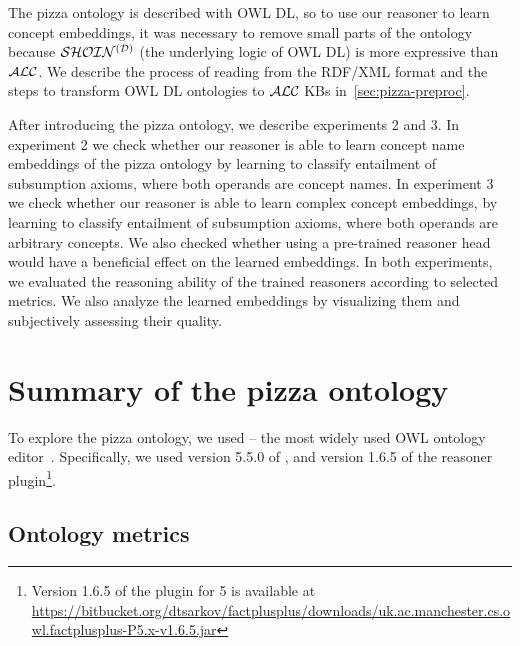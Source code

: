 The pizza ontology is described with OWL DL, so to use our reasoner to learn concept embeddings, it was necessary to remove small parts of the ontology because $\mathcal{SHOIN^{(D)}}$ (the underlying logic of OWL DL) is more expressive than $\mathcal{ALC}$.
We describe the process of reading from the RDF/XML format and the steps to transform OWL DL ontologies to $\mathcal{ALC}$ KBs in~\autoref{sec:pizza-preproc}.

After introducing the pizza ontology, we describe experiments 2 and 3.
In experiment 2 we check whether our reasoner is able to learn concept name embeddings of the pizza ontology by learning to classify entailment of subsumption axioms, where both operands are concept names.
In experiment 3 we check whether our reasoner is able to learn complex concept embeddings, by learning to classify entailment of subsumption axioms, where both operands are arbitrary concepts.
We also checked whether using a pre-trained reasoner head would have a beneficial effect on the learned embeddings.
In both experiments, we evaluated the reasoning ability of the trained reasoners according to selected metrics. We also analyze the learned embeddings by visualizing them and subjectively assessing their quality.

\newpage

\section{Summary of the pizza ontology}
\label{sec:pizza-analysis}

To explore the pizza ontology, we used \Protege{} -- the most widely used OWL ontology editor~\cite{musen_protege_2015}. Specifically, we used version 5.5.0 of \Protege, and version 1.6.5 of the \factpp{} reasoner plugin\footnote{Version 1.6.5 of the \factpp{} plugin for \Protege{} 5 is available at \url{https://bitbucket.org/dtsarkov/factplusplus/downloads/uk.ac.manchester.cs.owl.factplusplus-P5.x-v1.6.5.jar}}.

\subsection{Ontology metrics}

